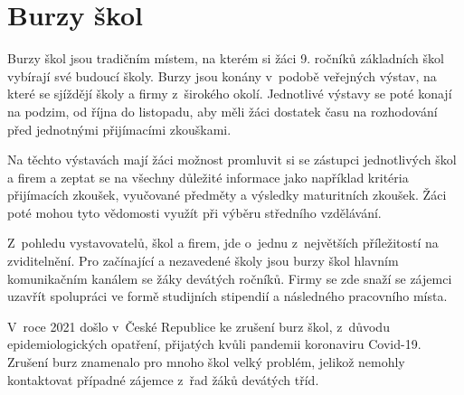 \section{Burzy škol}

Burzy škol jsou tradičním místem, na kterém si žáci 9. ročníků základních škol vybírají své budoucí školy. Burzy jsou konány v~podobě veřejných výstav, na které se sjíždějí školy a firmy z~širokého okolí. Jednotlivé výstavy se poté konají na podzim, od října do listopadu, aby měli žáci dostatek času na rozhodování před jednotnými přijímacími zkouškami.

Na těchto výstavách mají žáci možnost promluvit si se zástupci jednotlivých škol a firem a zeptat se na všechny důležité informace jako například kritéria přijímacích zkoušek, vyučované předměty a výsledky maturitních zkoušek. Žáci poté mohou tyto vědomosti využít při výběru středního vzdělávání.

Z~pohledu vystavovatelů, škol a firem, jde o~jednu z~největších příležitostí na zviditelnění. Pro začínající a nezavedené školy jsou burzy škol hlavním komunikačním kanálem se žáky devátých ročníků. Firmy se zde snaží se zájemci uzavřít spolupráci ve formě studijních stipendií a následného pracovního místa.

V~roce 2021 došlo v~České Republice ke zrušení burz škol, z~důvodu epidemiologických opatření, přijatých kvůli pandemii koronaviru Covid-19. Zrušení burz znamenalo pro mnoho škol velký problém, jelikož nemohly kontaktovat případné zájemce z~řad žáků devátých tříd.